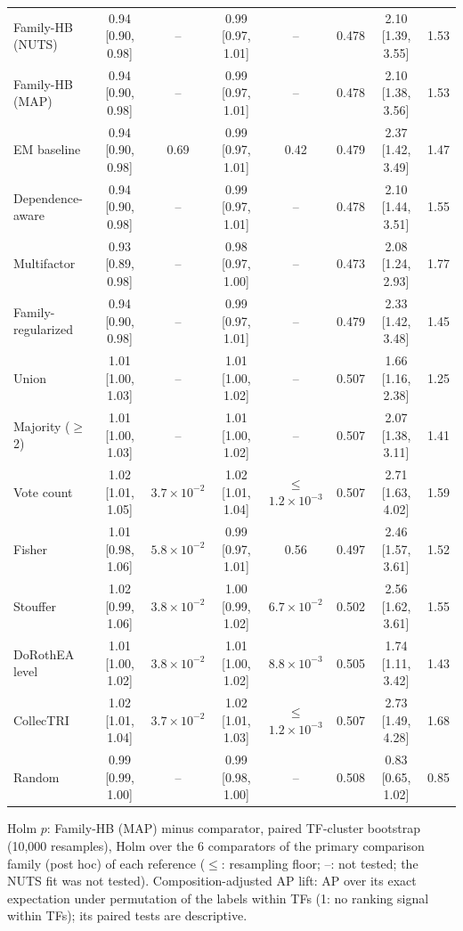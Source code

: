 \documentclass[11pt,a4paper]{article}
\begin{document}
\begin{table}[tbp]
{\begin{tabular}{@{}lccccccc@{}}
Family-HB (NUTS) & 0.94 [0.90, 0.98] & -- & 0.99 [0.97, 1.01] & -- & 0.478 & 2.10 [1.39, 3.55] & 1.53 \\
Family-HB (MAP) & 0.94 [0.90, 0.98] & -- & 0.99 [0.97, 1.01] & -- & 0.478 & 2.10 [1.38, 3.56] & 1.53 \\
EM baseline & 0.94 [0.90, 0.98] & 0.69 & 0.99 [0.97, 1.01] & 0.42 & 0.479 & 2.37 [1.42, 3.49] & 1.47 \\
Dependence-aware & 0.94 [0.90, 0.98] & -- & 0.99 [0.97, 1.01] & -- & 0.478 & 2.10 [1.44, 3.51] & 1.55 \\
Multifactor & 0.93 [0.89, 0.98] & -- & 0.98 [0.97, 1.00] & -- & 0.473 & 2.08 [1.24, 2.93] & 1.77 \\
Family-regularized & 0.94 [0.90, 0.98] & -- & 0.99 [0.97, 1.01] & -- & 0.479 & 2.33 [1.42, 3.48] & 1.45 \\
\addlinespace[2pt]
Union & 1.01 [1.00, 1.03] & -- & 1.01 [1.00, 1.02] & -- & 0.507 & 1.66 [1.16, 2.38] & 1.25 \\
Majority ($\geq$2) & 1.01 [1.00, 1.03] & -- & 1.01 [1.00, 1.02] & -- & 0.507 & 2.07 [1.38, 3.11] & 1.41 \\
Vote count & 1.02 [1.01, 1.05] & $3.7\times 10^{-2}$ & 1.02 [1.01, 1.04] & $\leq$$1.2\times 10^{-3}$ & 0.507 & 2.71 [1.63, 4.02] & 1.59 \\
Fisher & 1.01 [0.98, 1.06] & $5.8\times 10^{-2}$ & 0.99 [0.97, 1.01] & 0.56 & 0.497 & 2.46 [1.57, 3.61] & 1.52 \\
Stouffer & 1.02 [0.99, 1.06] & $3.8\times 10^{-2}$ & 1.00 [0.99, 1.02] & $6.7\times 10^{-2}$ & 0.502 & 2.56 [1.62, 3.61] & 1.55 \\
\addlinespace[2pt]
DoRothEA level & 1.01 [1.00, 1.02] & $3.8\times 10^{-2}$ & 1.01 [1.00, 1.02] & $8.8\times 10^{-3}$ & 0.505 & 1.74 [1.11, 3.42] & 1.43 \\
CollecTRI & 1.02 [1.01, 1.04] & $3.7\times 10^{-2}$ & 1.02 [1.01, 1.03] & $\leq$$1.2\times 10^{-3}$ & 0.507 & 2.73 [1.49, 4.28] & 1.68 \\
\addlinespace[2pt]
Random & 0.99 [0.99, 1.00] & -- & 0.99 [0.98, 1.00] & -- & 0.508 & 0.83 [0.65, 1.02] & 0.85 \\
\bottomrule
\end{tabular}
}
\par\smallskip
\begin{minipage}{\linewidth}\footnotesize
Holm $p$: Family-HB (MAP) minus comparator, paired TF-cluster bootstrap (10{,}000 resamples), Holm over the 6 comparators of the primary comparison family (post hoc) of each reference ($\leq$: resampling floor; --: not tested; the NUTS fit was not tested). Composition-adjusted AP lift: AP over its exact expectation under permutation of the labels within TFs (1: no ranking signal within TFs); its paired tests are descriptive.


\end{minipage}
\end{table}
\end{document}
